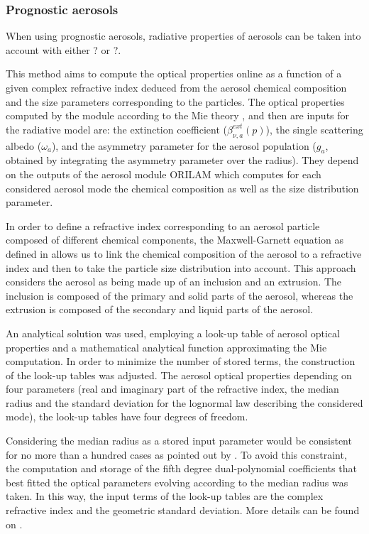 \subsubsection{Prognostic aerosols}

When using prognostic aerosols, radiative properties of aerosols can be taken into account with either ? or ?.

This method aims to compute the optical properties online as a function of a given complex refractive index deduced from the aerosol chemical composition and the size parameters corresponding to the particles.
The optical properties computed by the module according to the Mie theory \citep{Mie1908}, and then are inputs for the radiative model are: the extinction coefficient ($\beta_{\nu,a}^{ext}(p)$), the single scattering albedo ($\omega_a$), and the asymmetry parameter for the aerosol population ($g_a$, obtained by integrating the asymmetry parameter over the radius). They depend on the outputs of the aerosol module ORILAM which computes for each considered aerosol mode the chemical composition as well as the size distribution parameter.

In order to define a refractive index corresponding to an aerosol particle composed of different chemical components, the Maxwell-Garnett equation \citep{Maxwell-Garnett1904} as defined in \citet{Tombette2008} allows us to link the chemical composition of the aerosol to a refractive index and then to take the particle size  distribution into account. This approach considers the aerosol as being made up of an inclusion and an extrusion. The inclusion is composed of the primary and solid parts of the aerosol, whereas the extrusion is composed of the secondary and liquid parts of the aerosol.

An analytical solution was used, employing a look-up table of aerosol optical properties and a mathematical analytical function approximating the Mie computation. In order to minimize the number of stored terms, the construction of the look-up tables was adjusted. The aerosol optical properties depending on four parameters (real and imaginary part of the refractive index, the median radius and the standard deviation for the lognormal law describing the considered mode), the look-up tables have four degrees of freedom.

Considering the median radius as a stored input parameter would be consistent for no more than a hundred cases as pointed out by \citet{Grini2006}. To avoid this constraint, the computation and storage of the fifth degree dual-polynomial coefficients that best fitted the optical parameters evolving according to the median radius was taken. In this way, the input terms of the look-up tables are the complex refractive index and the geometric standard deviation. More details can be found on \citet{Aouizerats2010}.

